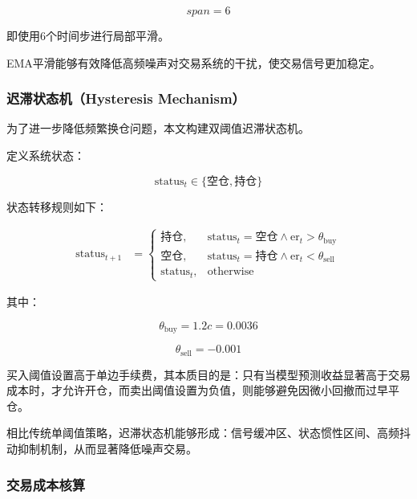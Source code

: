 \documentclass[withoutpreface,bwprint]{cumcmthesis}
\begin{document}
\begin{equation}
span=6
\end{equation}

即使用6个时间步进行局部平滑。

EMA平滑能够有效降低高频噪声对交易系统的干扰，使交易信号更加稳定。

\subsubsection{迟滞状态机（Hysteresis Mechanism）}

为了进一步降低频繁换仓问题，本文构建双阈值迟滞状态机。

定义系统状态：

\begin{equation}
\text{status}_t \in \{\text{空仓},\text{持仓}\}
\end{equation}

状态转移规则如下：

\begin{align}
    \text{status}_{t+1} &= 
    \begin{cases}
        \text{持仓}, & \text{status}_t = \text{空仓} \land \text{er}_t > \theta_{\text{buy}} \\
        \text{空仓}, & \text{status}_t = \text{持仓} \land \text{er}_t < \theta_{\text{sell}} \\
        \text{status}_t, & \text{otherwise}
    \end{cases}
    \label{eq:hysteresis}
\end{align}

其中：

\begin{equation}
\theta_{\text{buy}} = 1.2c = 0.0036
\end{equation}

\begin{equation}
\theta_{\text{sell}} = -0.001
\end{equation}

买入阈值设置高于单边手续费，其本质目的是：只有当模型预测收益显著高于交易成本时，才允许开仓，而卖出阈值设置为负值，则能够避免因微小回撤而过早平仓。

相比传统单阈值策略，迟滞状态机能够形成：信号缓冲区、状态惯性区间、高频抖动抑制机制，从而显著降低噪声交易。

\subsubsection{交易成本核算}
\end{document}
